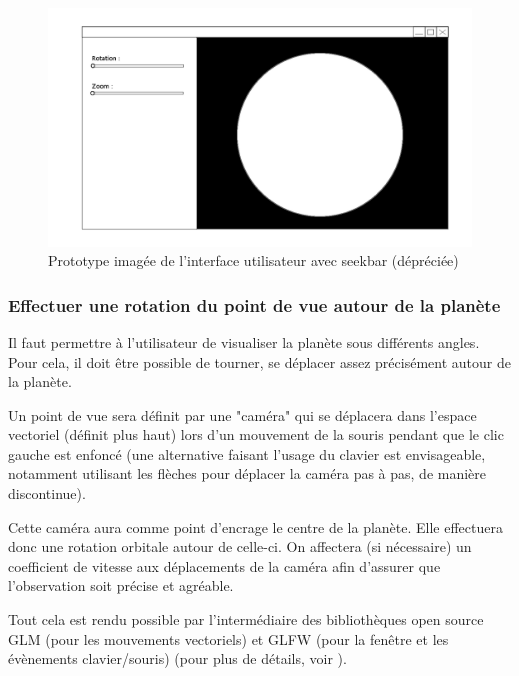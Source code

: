 \documentclass[a4paper]{article}
\begin{document}
        \begin{figure}[!h]
        \begin{center} \includegraphics[width=\linewidth]{img/interface_seekbar.png} \end{center}
        \caption{\label{itf_seekbar} Prototype imagée de l'interface utilisateur avec seekbar (dépréciée)}
        \end{figure}
    
    \newpage
        \subsubsection{Effectuer une rotation du point de vue autour de la planète} 
        
        Il faut permettre à l'utilisateur de visualiser la planète sous différents angles.
        Pour cela, il doit être possible de tourner, se déplacer assez précisément autour de la planète.
        
        Un point de vue sera définit par une "caméra" qui se déplacera dans l'espace vectoriel (définit plus haut) lors d'un mouvement de la souris pendant que le clic gauche est enfoncé (une alternative faisant l'usage du clavier est envisageable, notamment utilisant les flèches pour déplacer la caméra pas à pas, de manière discontinue).
        
        Cette caméra aura comme point d'encrage le centre de la planète. Elle effectuera donc une rotation orbitale autour de celle-ci. On affectera (si nécessaire) un coefficient de vitesse aux déplacements de la caméra afin d'assurer que l'observation soit précise et agréable.
        
        Tout cela est rendu possible par l'intermédiaire des bibliothèques open source GLM (pour les mouvements vectoriels) et GLFW (pour la fenêtre et les évènements clavier/souris) (pour plus de détails, voir \cite{TutoCamera}).
        
\end{document}
